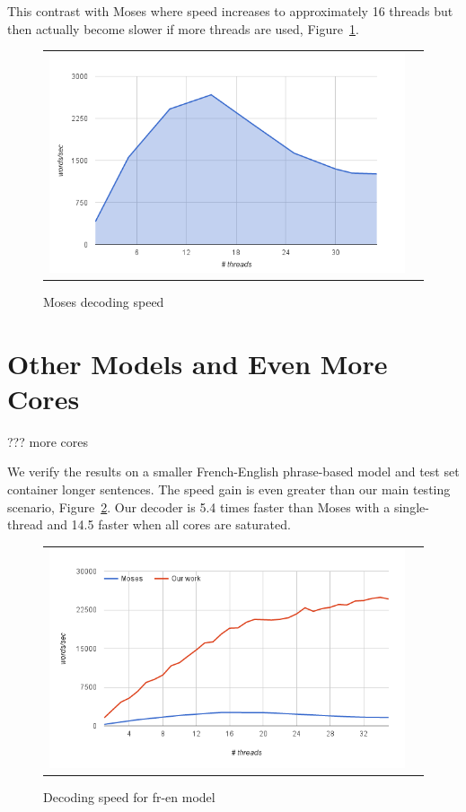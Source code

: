 \documentclass[11pt]{article}
\begin{document}
This contrast with Moses where speed increases to approximately 16 threads but then actually become slower if more threads are used, Figure~\ref{fig:moses-speed}.
\begin{figure}[h]
\centering
\begin{tabular}{cc}
{\includegraphics[scale=0.4]{moses-scalability.png}} 
\end{tabular}
\caption{Moses decoding speed}
\label{fig:moses-speed}
\end{figure} 


\section{Other Models and Even More Cores}

??? more cores

We verify the results on a smaller French-English phrase-based model and test set container longer sentences. The speed gain is even greater than our main testing scenario, Figure~\ref{fig:fr-en-speed}. Our decoder is 5.4 times faster than Moses with a single-thread and 14.5 faster when all cores are saturated.
\begin{figure}[h]
\centering
\begin{tabular}{cc}
{\includegraphics[scale=0.4]{fr-en-speed.png}} 
\end{tabular}
\caption{Decoding speed for fr-en model}
\label{fig:fr-en-speed}
\end{figure} 
\end{document}
